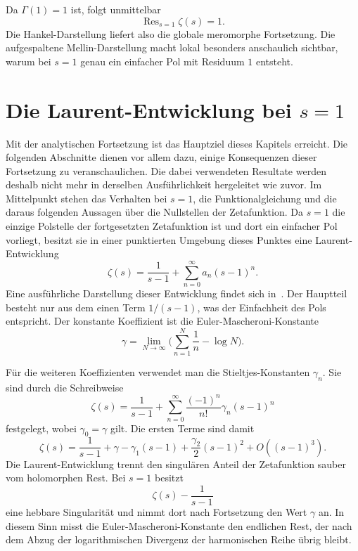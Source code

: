 Da $\Gamma(1)=1$ ist, folgt unmittelbar
\begin{equation}
\operatorname{Res}_{s=1}\zeta(s)
=
1.
\label{hankel:eq:residuum-eins}
\end{equation}
Die Hankel-Darstellung liefert also die globale meromorphe Fortsetzung.
Die aufgespaltene Mellin-Darstellung macht lokal besonders anschaulich sichtbar, warum bei $s=1$ genau ein einfacher Pol mit Residuum $1$ entsteht.


\section{Die Laurent-Entwicklung bei
\texorpdfstring{$s=1$}{s=1}
\label{hankel:section:laurent}}
Mit der analytischen Fortsetzung ist das Hauptziel dieses Kapitels erreicht. 
Die folgenden Abschnitte dienen vor allem dazu, einige
Konsequenzen dieser Fortsetzung zu veranschaulichen. 
Die dabei verwendeten Resultate werden deshalb nicht mehr in derselben Ausführlichkeit hergeleitet wie zuvor. 
Im Mittelpunkt stehen das Verhalten bei $s=1$, die Funktionalgleichung und die daraus folgenden
Aussagen über die Nullstellen der Zetafunktion.
Da $s=1$ die einzige Polstelle der fortgesetzten Zetafunktion ist und dort ein einfacher Pol vorliegt, besitzt sie in einer punktierten Umgebung dieses Punktes eine Laurent-Entwicklung
\begin{equation}
\zeta(s)
=
\frac{1}{s-1}
+
\sum_{n=0}^{\infty}a_n(s-1)^n.
\label{hankel:eq:laurent-allgemein}
\end{equation}
Eine ausführliche Darstellung dieser Entwicklung findet sich in~\cite{hankel:dlmf}.
Der Hauptteil besteht nur aus dem einen Term $1/(s-1)$, was der Einfachheit des Pols entspricht. 
Der konstante Koeffizient ist die Euler-Mascheroni-Konstante
\begin{equation}
\gamma
=
\lim_{N\to\infty}
\biggl(
\sum_{n=1}^{N}\frac{1}{n}-\log N
\biggr).
\label{hankel:eq:euler-mascheroni}
\end{equation}

Für die weiteren Koeffizienten verwendet man die
Stieltjes-Konstanten $\gamma_n$. 
Sie sind durch die Schreibweise
\begin{equation}
\boxed{
\zeta(s)
=
\frac{1}{s-1}
+
\sum_{n=0}^{\infty}
\frac{(-1)^n}{n!}\gamma_n(s-1)^n
}
\label{hankel:eq:laurent-stieltjes}
\end{equation}
festgelegt, wobei $\gamma_0=\gamma$ gilt. 
Die ersten Terme sind damit
\begin{equation}
\zeta(s)
=
\frac{1}{s-1}
+
\gamma
-
\gamma_1(s-1)
+
\frac{\gamma_2}{2}(s-1)^2
+
O((s-1)^3).
\label{hankel:eq:laurent-erste-terme}
\end{equation}
Die Laurent-Entwicklung trennt den singulären Anteil der Zetafunktion sauber vom holomorphen Rest. 
Bei $s=1$ besitzt
\begin{equation}
\zeta(s)-\frac{1}{s-1}
\label{hankel:eq:regulaerer-rest}
\end{equation}
eine hebbare Singularität und nimmt dort nach Fortsetzung den Wert $\gamma$ an. 
In diesem Sinn misst die Euler-Mascheroni-Konstante den endlichen Rest, der nach dem Abzug der logarithmischen Divergenz der harmonischen Reihe übrig bleibt.


